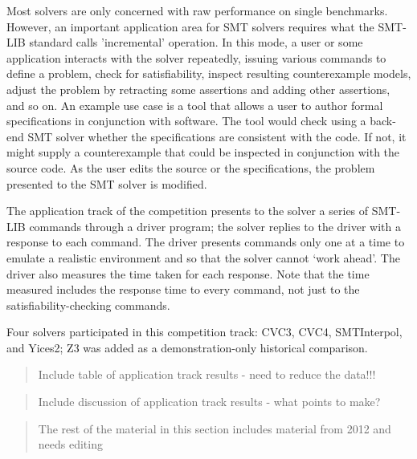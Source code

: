 \documentclass[twosize,11pt]{article}
\newcommand{\comment}[2]{\begin{quote}\sc #1\marginpar{\textcolor{red}{$\ast^{\mbox{#2}}$}}\end{quote}}
\newcommand{\davidc}[1]{\comment{#1}{DC}}
\begin{document}
Most solvers are only concerned with raw performance on single benchmarks. However, an important application area for SMT solvers requires what the SMT-LIB standard calls 'incremental' operation.
In this mode, a user or some application interacts with the solver repeatedly, issuing various commands to define a problem, check for satisfiability, inspect resulting counterexample models, adjust the problem by retracting some assertions and adding other assertions, and so on. An example use case is a tool that allows a user to author formal specifications in conjunction with software. The tool would
check using a back-end SMT solver whether the specifications are consistent with the code. If not, it might
supply a counterexample that could be inspected in conjunction with the source code. As the user edits the source or the specifications, the problem presented to the SMT solver is modified. 

The application track of the competition presents to the solver a series of SMT-LIB commands through a driver program; the solver replies to the driver with a 
response to each command. The driver presents commands only one at a time to emulate a realistic environment and so that the solver cannot `work ahead'. The driver also measures the time taken for each response. Note that the time measured includes the response time to every command, not just to the satisfiability-checking commands.

Four solvers participated in this competition track: CVC3, CVC4, SMTInterpol, and Yices2; Z3 was added as a demonstration-only historical comparison.

\davidc{Include table of application track results - need to reduce the data!!!}

\davidc{Include discussion of application track results - what points to make?}

\davidc{The rest of the material in this section includes material from 2012 and needs editing}
\end{document}
